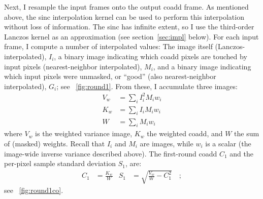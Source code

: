 \documentclass[11pt,preprint]{aastex}
\newcommand{\figref}[1]{\figurename~\ref{#1}}
\newcommand{\secref}[1]{section~\ref{#1}}
\newcommand{\fimg}[1]{#1}
\newcommand{\img}{\fimg{I}}
\newcommand{\wt}{w}
\newcommand{\mask}{\fimg{M}}
\newcommand{\good}{\fimg{G}}
\newcommand{\covar}{\fimg{V}}
\newcommand{\coacc}{\fimg{K}}
\newcommand{\coadd}{\fimg{C}}
\newcommand{\cowt}{\fimg{W}}
\newcommand{\copp}{\fimg{S}}
\begin{document}
Next, I resample the input frames onto the output coadd frame.  As
mentioned above, the sinc interpolation kernel can be used to perform
this interpolation without loss of information.  The sinc has infinite
extent, so I use the third-order Lanczos kernel as an approximation
(see \secref{sec:impl} below).  For each input frame, I compute a
number of interpolated values: The image itself
(Lanczos-interpolated), $\img_i$, a binary image indicating which
coadd pixels are touched by input pixels (nearest-neighbor
interpolated), $\mask_i$, and a binary image indicating which input
pixels were unmasked, or ``good'' (also nearest-neighbor
interpolated), $\good_i$; see \figref{fig:round1}.  From these, I
accumulate three images:
\begin{align}
  \covar_w  &= \sum_i \img_i^2 \mask_i \wt_i \\
  \coacc_w  &= \sum_i \img_i   \mask_i \wt_i \\
  \cowt     &= \sum_i \mask_i  \wt_i
\end{align}
where $\covar_w$ is the weighted variance image, $\coacc_w$ the
weighted coadd, and $\cowt$ the sum of (masked) weights.  Recall that
$\img_i$ and $\mask_i$ are images, while $\wt_i$ is a scalar (the
image-wide inverse variance described above).  The first-round coadd
$\coadd_1$ and the per-pixel sample standard deviation $\copp_1$, are:
\begin{align}
  \coadd_1  &= \frac{\coacc_w}{\cowt} &
  \copp_1   &= \sqrt{\frac{\covar_w}{\cowt} - \coadd_1^2} \quad;
\end{align}
see \figref{fig:round1co}.
\end{document}
